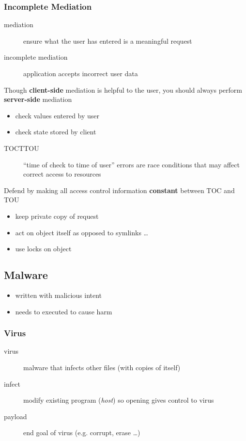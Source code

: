 \documentclass[]{article}
\theoremstyle{definition}
\begin{document}
	\subsubsection{Incomplete Mediation}
	\begin{description}
		\item[mediation] ensure what the user has entered is a meaningful request
		\item[incomplete mediation] application accepts incorrect user data
	\end{description}
	Though \textbf{client-side} mediation is helpful to the user, you should always perform \textbf{server-side} mediation
	\begin{itemize}
		\item check values entered by user
		\item check state stored by client
	\end{itemize}
	\begin{description}
		\item[TOCTTOU] ``time of check to time of user'' errors are race conditions that may affect correct access to resources
	\end{description}
	Defend by making all access control information \textbf{constant} between TOC and TOU
	\begin{itemize}
		\item keep private copy of request
		\item act on object itself as opposed to symlinks \dots
		\item use locks on object
	\end{itemize}

	\subsection{Malware}
	\begin{itemize}
		\item written with malicious intent
		\item needs to executed to cause harm
	\end{itemize}

	\subsubsection{Virus}
	\begin{description}
		\item[virus] malware that infects other files (with copies of itself)
		\item[infect] modify existing program (\textit{host}) so opening gives control to virus
		\item[payload] end goal of virus (e.g. corrupt, erase \dots)
	\end{description}
\end{document}
